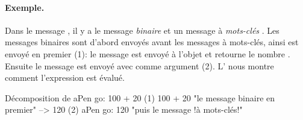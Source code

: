\documentclass[a4paper,10pt,twoside]{book}
\begin{document}
\paragraph{Exemple.} Dans le message , il y a le message \emph{binaire}  et un message \`a \emph{mots-cl\'es} . Les messages binaires sont d'abord envoy\'es avant les messages \`a mots-cl\'es, ainsi  est envoy\'e en premier (1): le message  est envoy\'e \`a l'objet  et retourne le nombre . Ensuite le message  est envoy\'e avec comme argument  (2).
L' nous montre comment l'expression est \'evalu\'e. 

\begin{example}[decGo]{D\'ecomposition de }{}
      aPen go: 100 + 20   
(1)                 100 + 20           "le message binaire en premier"
                   -->   120
(2)  aPen go: 120                   "puis le message !\`a mots-cl\'es!"
\end{example}
\end{document}
